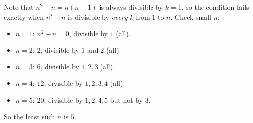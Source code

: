 Note that $n^2-n=n(n-1)$ is always divisible by $k=1$, so the condition fails exactly when $n^2-n$ is divisible by \emph{every} $k$ from $1$ to $n$. Check small $n$:
\begin{itemize}
\item $n=1$: $n^2-n=0$, divisible by $1$ (all).
\item $n=2$: $2$, divisible by $1$ and $2$ (all).
\item $n=3$: $6$, divisible by $1,2,3$ (all).
\item $n=4$: $12$, divisible by $1,2,3,4$ (all).
\item $n=5$: $20$, divisible by $1,2,4,5$ but not by $3$.
\end{itemize}
So the least such $n$ is $\boxed{5}$.
